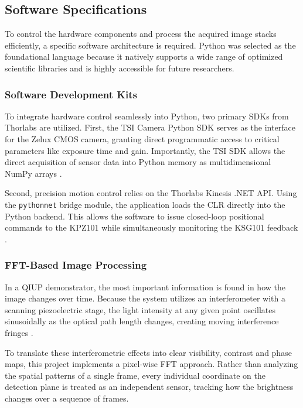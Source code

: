 \documentclass[12pt,a4paper]{article}
\begin{document}
    \subsection{Software Specifications}
        To control the hardware components and process the acquired image stacks efficiently, a specific software architecture is required. Python was selected as the foundational language because it natively supports a wide range of optimized scientific libraries and is highly accessible for future researchers.

        \subsubsection{Software Development Kits} 
            To integrate hardware control seamlessly into Python, two primary \ac{SDK}s from Thorlabs are utilized. 
            First, the \ac{TSI} Camera Python \ac{SDK} serves as the interface for the Zelux \ac{CMOS} camera, granting direct programmatic access to critical parameters like exposure time and gain. Importantly, the \ac{TSI} \ac{SDK} allows the direct acquisition of sensor data into Python memory as multidimensional NumPy arrays \cite{TSIDocs}. 
            
            Second, precision motion control relies on the Thorlabs Kinesis .NET API. Using the \texttt{pythonnet} bridge module, the application loads the \ac{CLR} directly into the Python backend. This allows the software to issue closed-loop positional commands to the \ac{KPZ101} while simultaneously monitoring the \ac{KSG101} feedback \cite{KinesisInPython}.
        
        \subsubsection{FFT-Based Image Processing}
            In a \ac{QIUP} demonstrator, the most important information is found in how the image changes over time. Because the system utilizes an interferometer with a scanning piezoelectric stage, the light intensity at any given point oscillates sinusoidally as the optical path length changes, creating moving interference fringes \cite{xie2018surface}.

            To translate these interferometric effects into clear visibility, contrast and phase maps, this project implements a pixel-wise \ac{FFT} approach. Rather than analyzing the spatial patterns of a single frame, every individual coordinate on the detection plane is treated as an independent sensor, tracking how the brightness changes over a sequence of frames.
    
\end{document}
